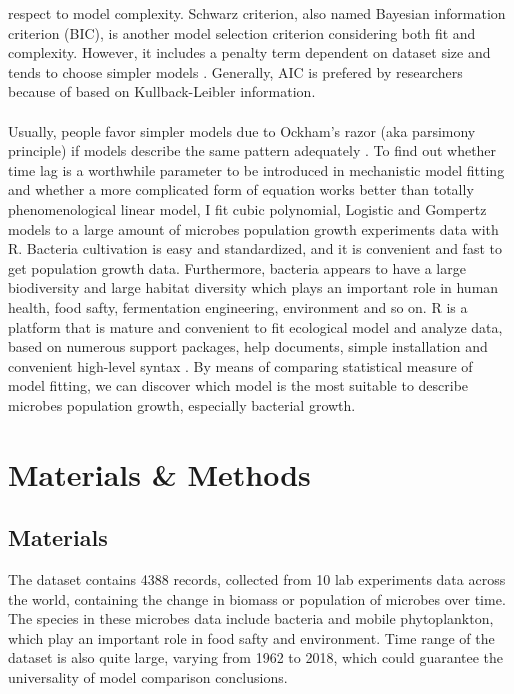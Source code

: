 \documentclass[11pt]{article}
\begin{document}
    respect to model complexity. Schwarz criterion, also named Bayesian information criterion (BIC), is 
    another model selection criterion considering both fit and complexity. However, it includes a penalty 
    term dependent on dataset size and tends to choose simpler models \citep{JOHNSON2004101}. Generally, AIC 
    is prefered by researchers because of based on Kullback-Leibler information.\\
    \\
    Usually, people favor simpler models due to Ockham's razor (aka parsimony principle) if models describe 
    the same pattern adequately \citep{Peleg2011}. To find out whether time lag is a worthwhile parameter to be 
    introduced in mechanistic model fitting and whether a more complicated form of equation works better 
    than totally phenomenological linear model, I fit cubic polynomial, Logistic and Gompertz models to 
    a large amount of microbes population growth experiments data with R. Bacteria cultivation is easy and 
    standardized, and it is convenient and fast to get population growth data. Furthermore, bacteria appears 
    to have a large biodiversity and large habitat diversity which plays an important role in human health, 
    food safty, fermentation engineering, environment and so on. R is a platform that is mature and convenient 
    to fit ecological model and analyze data, based on numerous support packages, help documents, simple 
    installation and convenient high-level syntax \citep{Benjamin2013}. By means of comparing statistical 
    measure of model fitting, we can discover which model is the most suitable to describe microbes population 
    growth, especially bacterial growth.

  
  \section{Materials \& Methods}
  \subsection{Materials}
    The dataset contains 4388 records, collected from 10 lab experiments data across the world, containing 
    the change in biomass or population of microbes over time. The species in these microbes 
    data include bacteria and mobile phytoplankton, which play an important role in food safty and 
    environment. Time range of the dataset is also quite large, varying from 1962 to 2018, which could 
    guarantee the universality of model comparison conclusions. 
\end{document}

